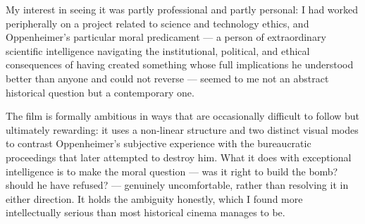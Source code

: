 \begin{ieltsanswer}
My interest in seeing it was partly professional and partly personal: I had worked peripherally on a project related to science and technology ethics, and Oppenheimer's particular moral predicament — a person of extraordinary scientific intelligence navigating the institutional, political, and ethical consequences of having created something whose full implications he understood better than anyone and could not reverse — seemed to me not an abstract historical question but a contemporary one.

The film is formally ambitious in ways that are occasionally difficult to follow but ultimately rewarding: it uses a non-linear structure and two distinct visual modes to contrast Oppenheimer's subjective experience with the bureaucratic proceedings that later attempted to destroy him. What it does with exceptional intelligence is to make the moral question — was it right to build the bomb? should he have refused? — genuinely uncomfortable, rather than resolving it in either direction. It holds the ambiguity honestly, which I found more intellectually serious than most historical cinema manages to be.
\end{ieltsanswer}


